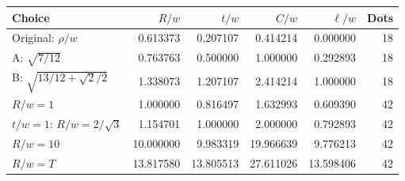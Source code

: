 \begin{tabular}{@{}lrrrrr@{}}\toprule Choice & $R/w$ & $t/w$ & $C/w$ & $\ell/w$ & Dots\\\midrule
Original: $\rho/w$ & 0.613373 & 0.207107 & 0.414214 & 0.000000 & 18 \\
A: $\sqrt{7/12}$ & 0.763763 & 0.500000 & 1.000000 & 0.292893 & 18 \\
B: $\sqrt{13/12+\sqrt2/2}$ & 1.338073 & 1.207107 & 2.414214 & 1.000000 & 18 \\
$R/w=1$ & 1.000000 & 0.816497 & 1.632993 & 0.609390 & 42 \\
$t/w=1$: $R/w=2/\sqrt3$ & 1.154701 & 1.000000 & 2.000000 & 0.792893 & 42 \\
$R/w=10$ & 10.000000 & 9.983319 & 19.966639 & 9.776213 & 42 \\
$R/w=T$ & 13.817580 & 13.805513 & 27.611026 & 13.598406 & 42 \\
\bottomrule\end{tabular}